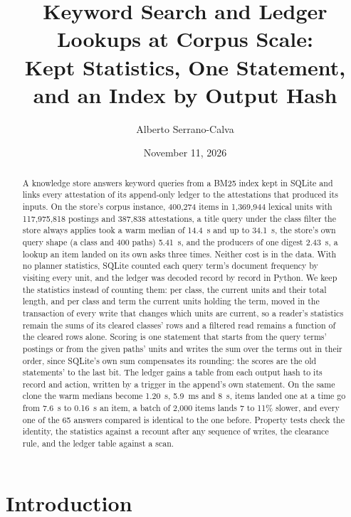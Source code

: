 \documentclass[11pt]{article}
\title{Keyword Search and Ledger Lookups at Corpus Scale:\\
Kept Statistics, One Statement, and an Index by Output Hash}
\author{Alberto Serrano-Calva}
\date{November 11, 2026}
\theoremstyle{plain}
\theoremstyle{definition}
\theoremstyle{remark}
\newcommand{\nItems}{400{,}274}
\newcommand{\nUnits}{1{,}369{,}944}
\newcommand{\nPostings}{117{,}975{,}818}
\newcommand{\nRecords}{387{,}838}
\newcommand{\nPaths}{400}
\newcommand{\nAnswers}{65}
\newcommand{\kwBefore}{14.4}
\newcommand{\kwBeforeMax}{34.1}
\newcommand{\kwAfter}{1.20}
\newcommand{\pathsBefore}{5.41}
\newcommand{\pathsAfter}{5.9}
\newcommand{\ledgerBefore}{2.43}
\newcommand{\ledgerAfter}{8}
\newcommand{\singleBefore}{7.6}
\newcommand{\singleAfter}{0.16}
\begin{document}
\maketitle

\begin{abstract}
A knowledge store answers keyword queries from a BM25 index kept in SQLite and links every
attestation of its append-only ledger to the attestations that produced its inputs. On the
store's corpus instance, \nItems{} items in \nUnits{} lexical units with \nPostings{} postings and
\nRecords{} attestations, a title query under the class filter the store always applies took a
warm median of \kwBefore{}~s and up to \kwBeforeMax{}~s, the store's own query shape (a class and
\nPaths{} paths) \pathsBefore{}~s, and the producers of one digest \ledgerBefore{}~s, a lookup an
item landed on its own asks three times. Neither cost is in the data. With no planner statistics,
SQLite counted each query term's document frequency by visiting every unit, and the ledger was
decoded record by record in Python. We keep the statistics instead of counting them: per class,
the current units and their total length, and per class and term the current units holding the
term, moved in the transaction of every write that changes which units are current, so a reader's
statistics remain the sums of its cleared classes' rows and a filtered read remains a function of
the cleared rows alone. Scoring is one statement that starts from the query terms' postings or
from the given paths' units and writes the sum over the terms out in their order, since SQLite's
own sum compensates its rounding: the scores are the old statements' to the last bit. The ledger
gains a table from each output hash to its record and action, written by a trigger in the
append's own statement. On the same clone the warm medians become \kwAfter{}~s, \pathsAfter{}~ms
and \ledgerAfter{}~\textmu s, items landed one at a time go from \singleBefore{}~s to
\singleAfter{}~s an item, a batch of 2{,}000 items lands 7 to 11\% slower, and every one of the
\nAnswers{} answers compared is identical to the one before. Property tests check the identity,
the statistics against a recount after any sequence of writes, the clearance rule, and the ledger
table against a scan.
\end{abstract}

\section{Introduction}\label{sec:intro}
\end{document}
